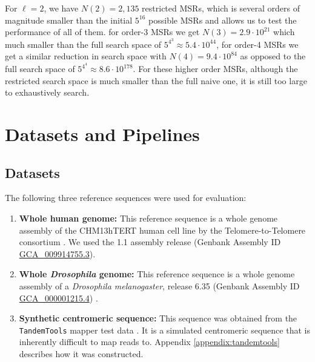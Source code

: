\documentclass[
  11pt,
  twoside]{scrbook}
\begin{document}
For \(\ell=2\), we have \(N(2)=2,135\) restricted MSRs, which is
several orders of magnitude smaller than the initial \(5^{16}\) possible
MSRs and allows us to test the performance of all of them. for order-3
MSRs we get \(N(3)=2.9\cdot10^{21}\) which much smaller than the full
search space of \(5^{4^3}\approx5.4\cdot10^{44}\), for order-4 MSRs we get
a similar reduction in search space with \(N(4)=9.4\cdot10^{84}\) as
opposed to the full search space of \(5^{4^4}\approx8.6\cdot10^{178}\).
For these higher order MSRs, although the restricted search space is
much smaller than the full naive one, it is still too large to
exhaustively search.

\hypertarget{datasets-and-pipelines}{%
\section{Datasets and Pipelines}\label{datasets-and-pipelines}}

\hypertarget{datasets}{%
\subsection{Datasets}\label{datasets}}

The following three reference sequences were used for evaluation:

\begin{enumerate}
\def\labelenumi{\arabic{enumi}.}
\item
  \textbf{Whole human genome:} This reference sequence is a whole genome assembly
  of the CHM13hTERT human cell line by the Telomere-to-Telomere consortium
  \autocite[@][]{nurk2022}. We used the 1.1 assembly release (Genbank
  Assembly ID
  \href{https://www.ncbi.nlm.nih.gov/assembly/GCA_009914755.3/}{GCA\_009914755.3}).
\item
  \textbf{Whole \emph{Drosophila} genome:} This reference sequence is a whole genome
  assembly of a \emph{Drosophila melanogaster}, release 6.35 (Genbank Assembly ID
  \href{https://www.ncbi.nlm.nih.gov/assembly/GCF_000001215.4/}{GCA\_000001215.4})
  \autocite{adamsGenomeSequenceDrosophila2000}.
\item
  \textbf{Synthetic centromeric sequence:} This sequence was obtained from the
  \texttt{TandemTools} mapper test data \autocite{mikheenkoTandemToolsMappingLong2020}. It is
  a simulated centromeric sequence that is inherently difficult to map reads
  to. Appendix \ref{appendix:tandemtools} describes how it was constructed.
\end{enumerate}
\end{document}

